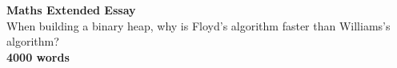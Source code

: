 \begin{titlepage}
    \begin{center}
        \vspace*{1cm}
        \large{\textbf{Maths Extended Essay}}\\
        \vspace{0.5cm}
        \small{When building a binary heap, why is Floyd’s algorithm faster than Williams’s algorithm?}\\
        \vspace{1.5cm}
        \small{\textbf{4000 words}}\\
    \end{center}
\end{titlepage}
